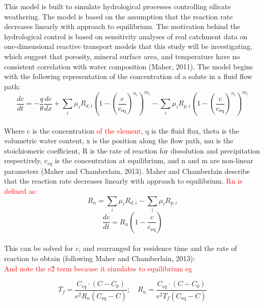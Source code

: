 This model is built to simulate hydrological processes controlling silicate weathering. The model is based on the assumption that the reaction rate decreases linearly with approach to equilibrium. The motivation behind the hydrological control is based on sensitivity analyses of real catchment data on one-dimensional reactive transport models that this study will be investigating, which suggest that porosity, mineral surface area, and temperature have no consistent correlation with water composition (Maher, 2011). The model begins with the following representation of the concentration of a solute in a fluid flow path:\\ 

\begin{equation}
\frac{dc}{dt} = -\frac{q}{\theta} \frac{dc}{dx} + \sum_{i} \mu_i R_{d,i} \left( 1 - \left( \frac{c}{c_{\text{eq}}} \right)^{n_i} \right)^{m_i} - \sum_{i} \mu_i R_{p,i} \left( 1 - \left( \frac{c}{c_{\text{eq}}} \right)^{n_i} \right)^{m_i}
\end{equation}\\

Where c is the concentration \textcolor{red}{of the element}, q is the fluid flux, theta is the volumetric water content, x is the position along the flow path, mu is the stoichiomeric coefficient, R is the rate of reaction for dissolution and precipitation respectively, c$_{eq}$ is the concentration at equilibrium, and n and m are non-linear parameters (Maher and Chamberlain, 2013). Maher and Chamberlain describe that the reaction rate decreases linearly with approach to equilibrium. \textcolor{red}{Rn is defined as:} \\

\begin{equation}
R_n = \sum_{i} \mu_i R_{d,i} - \sum_{i} \mu_i R_{p,i}
\end{equation} 
\begin{equation}
\frac{dc}{dt} = R_n \left( 1 - \frac{c}{c_{\text{eq}}} \right)
\end{equation} \\

This can be solved for \( c \), and rearranged for residence time and the rate of reaction to obtain (following Maher and Chamberlain, 2013):\\
\textcolor{red}{And note the e\^2 term because it simulates to equilibrium eg}

\begin{equation}
    T_f = \frac{C_{eq} \cdot \left(C - C_0\right)}{e^2 R_n \left( C_{\text{eq}} - C \right)};  \quad
    R_n = \frac{C_{eq} \cdot \left(C - C_0\right)}{e^2 T_f \left( C_{\text{eq}} - C \right)}
\end{equation}\\


